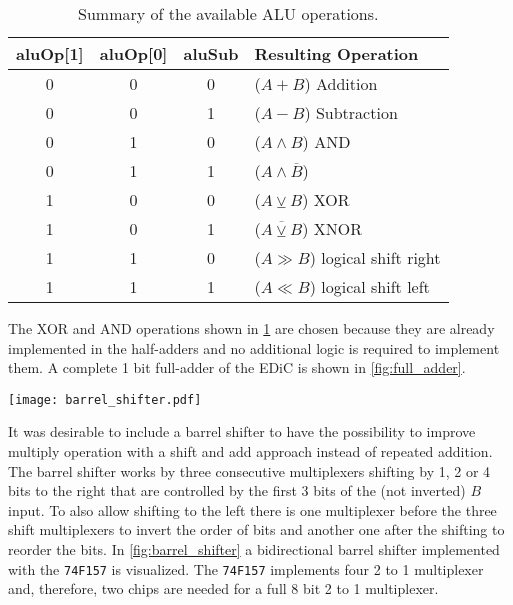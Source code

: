 \begin{table}
  \centering
  \renewcommand{\arraystretch}{1.25}
  \caption{Summary of the available \gls{ALU} operations.}
  \label{tab:aluOp}
  \begin{tabularx}{.8\textwidth}{ |c|c|c||X| }
    \hline
    aluOp[1] & aluOp[0] & aluSub & Resulting Operation             \\\hline\hline
    0        & 0        & 0      & ($A + B$) Addition              \\\hline
    0        & 0        & 1      & ($A - B$) Subtraction           \\\hline
    0        & 1        & 0      & ($A \land B$) AND               \\\hline
    0        & 1        & 1      & ($A \land \overline{B}$)        \\\hline
    1        & 0        & 0      & ($A \veebar B$) XOR             \\\hline
    1        & 0        & 1      & ($\overline{A \veebar B}$) XNOR \\\hline
    1        & 1        & 0      & ($A \gg B$) logical shift right \\\hline
    1        & 1        & 1      & ($A \ll B$) logical shift left  \\\hline
  \end{tabularx}
\end{table}
The XOR and AND operations shown in \cref{tab:aluOp} are chosen because they are already implemented in the half-adders and no additional logic is required to implement them.
A complete 1 bit full-adder of the \gls{EDiC} is shown in \cref{fig:full_adder}.

\begin{sidewaysfigure}[p]
  \centering
  \texttt{[image: barrel\_shifter.pdf]}
  \caption{8 bit bidirectional barrel shifter.}
  \label{fig:barrel_shifter}
\end{sidewaysfigure}
It was desirable to include a barrel shifter to have the possibility to improve multiply operation with a shift and add approach instead of repeated addition.
The barrel shifter works by three consecutive multiplexers shifting by 1, 2 or 4 bits to the right that are controlled by the first 3 bits of the (not inverted) $B$ input.
To also allow shifting to the left there is one multiplexer before the three shift multiplexers to invert the order of bits and another one after the shifting to reorder the bits.
In \cref{fig:barrel_shifter} a bidirectional barrel shifter implemented with the \texttt{74F157} is visualized. The \texttt{74F157} implements four 2 to 1 multiplexer and, therefore, two chips are needed for a full 8 bit 2 to 1 multiplexer.

